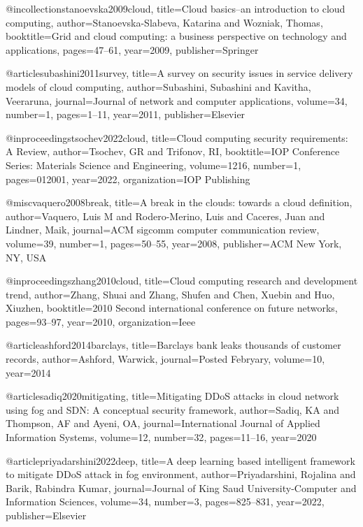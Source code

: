 @incollection{stanoevska2009cloud,
title={Cloud basics--an introduction to cloud computing},
author={Stanoevska-Slabeva, Katarina and Wozniak, Thomas},
booktitle={Grid and cloud computing: a business perspective on technology and applications},
pages={47--61},
year={2009},
publisher={Springer}
}

@article{subashini2011survey,
title={A survey on security issues in service delivery models of cloud computing},
author={Subashini, Subashini and Kavitha, Veeraruna},
journal={Journal of network and computer applications},
volume={34},
number={1},
pages={1--11},
year={2011},
publisher={Elsevier}
}

@inproceedings{tsochev2022cloud,
title={Cloud computing security requirements: A Review},
author={Tsochev, GR and Trifonov, RI},
booktitle={IOP Conference Series: Materials Science and Engineering},
volume={1216},
number={1},
pages={012001},
year={2022},
organization={IOP Publishing}
}

@misc{vaquero2008break,
title={A break in the clouds: towards a cloud definition},
author={Vaquero, Luis M and Rodero-Merino, Luis and Caceres, Juan and Lindner, Maik},
journal={ACM sigcomm computer communication review},
volume={39},
number={1},
pages={50--55},
year={2008},
publisher={ACM New York, NY, USA}
}

@inproceedings{zhang2010cloud,
title={Cloud computing research and development trend},
author={Zhang, Shuai and Zhang, Shufen and Chen, Xuebin and Huo, Xiuzhen},
booktitle={2010 Second international conference on future networks},
pages={93--97},
year={2010},
organization={Ieee}
}

@article{ashford2014barclays,
title={Barclays bank leaks thousands of customer records},
author={Ashford, Warwick},
journal={Posted Febryary},
volume={10},
year={2014}
}

@article{sadiq2020mitigating,
  title={Mitigating DDoS attacks in cloud network using fog and SDN: A conceptual security framework},
  author={Sadiq, KA and Thompson, AF and Ayeni, OA},
  journal={International Journal of Applied Information Systems},
  volume={12},
  number={32},
  pages={11--16},
  year={2020}
}

@article{priyadarshini2022deep,
  title={A deep learning based intelligent framework to mitigate DDoS attack in fog environment},
  author={Priyadarshini, Rojalina and Barik, Rabindra Kumar},
  journal={Journal of King Saud University-Computer and Information Sciences},
  volume={34},
  number={3},
  pages={825--831},
  year={2022},
  publisher={Elsevier}
}